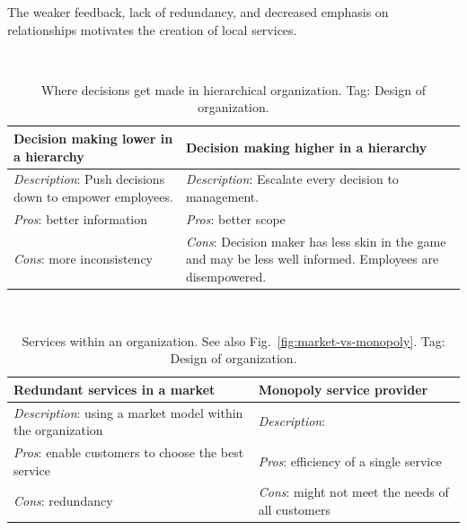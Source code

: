 The weaker feedback, lack of redundancy, and decreased emphasis on relationships motivates the creation of local services. 

\ \\

\begin{center}
\begin{table}[ht]
\begin{tabular}{ | m{\dilemmatablewidth}| m{\dilemmatablewidth} | } 
  \hline
  \textbf{Decision making lower in a hierarchy} &
  \textbf{Decision making higher in a hierarchy} \\
  \hline
  \textit{Description}: Push decisions down to empower employees. &
  \textit{Description}: Escalate every decision to management. \\  
  \hline
  \textit{Pros}: better information &
  \textit{Pros}: better scope \\
  \hline
  \textit{Cons}: more inconsistency & 
  \textit{Cons}: Decision maker has less skin in the game and may be less well informed. Employees are disempowered. \\
  \hline
\end{tabular}
\caption{Where decisions get made in hierarchical organization.
{\tiny Tag: Design of organization.}
}
\label{table:decisions_low-vs-high}
\end{table}
\end{center}

\ \\

\begin{center}
\begin{table}[ht]
\begin{tabular}{ | m{\dilemmatablewidth}| m{\dilemmatablewidth} | } 
  \hline
  \textbf{Redundant services in a market} &
  \textbf{Monopoly service provider} \\
  \hline
  \textit{Description}: using a market model within the organization &
  \textit{Description}:  \\  
  \hline
  \textit{Pros}: enable customers to choose the best service &
  \textit{Pros}: efficiency of a single service \\
  \hline
  \textit{Cons}: redundancy & 
  \textit{Cons}: might not meet the needs of all customers \\
  \hline
\end{tabular}
\caption{Services within an organization. See also Fig.~\ref{fig:market-vs-monopoly}.
{\tiny Tag: Design of organization.}
}
\label{table:market-vs-monopoly}
\end{table}
\end{center}


